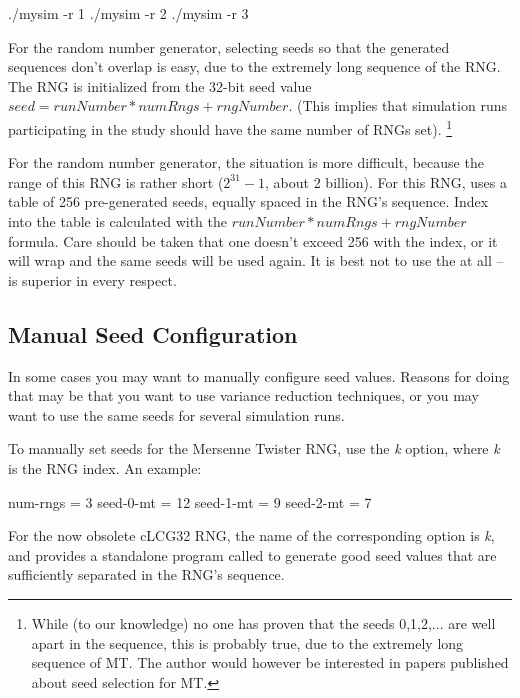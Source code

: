 \begin{commandline}
./mysim -r 1
./mysim -r 2
./mysim -r 3
\end{commandline}

For the  random number generator, selecting seeds
so that the generated sequences don't overlap is easy,
due to the extremely long sequence of the RNG.
The RNG is initialized from the 32-bit seed value $seed = runNumber*numRngs + rngNumber$.
(This implies that simulation runs participating in the study should have
the same number of RNGs set).
    \footnote{While (to our knowledge) no one has proven that the seeds 0,1,2,...
    are well apart in the sequence, this is probably true, due to the extremely
    long sequence of MT. The author would however be interested in papers
    published about seed selection for MT.}

For the  random number generator, the situation is more difficult,
because the range of this RNG is rather short ($2^{31}-1$, about 2 billion).
For this RNG, {\opp} uses a table of 256 pre-generated seeds, equally spaced
in the RNG's sequence. Index into the table is calculated with the
$runNumber*numRngs + rngNumber$ formula. Care should be taken that
one doesn't exceed 256 with the index, or it will wrap and the
same seeds will be used again. It is best not to use the 
at all --  is superior in every respect.


\subsection{Manual Seed Configuration}

In some cases you may want to manually configure seed values.
Reasons for doing that may be that you want to use variance reduction
techniques, or you may want to use the same seeds for several simulation
runs.

To manually set seeds for the Mersenne Twister RNG, use the \textit{k}
option, where \textit{k} is the RNG index. An example:

\begin{inifile}
[General]
num-rngs = 3
seed-0-mt = 12
seed-1-mt = 9
seed-2-mt = 7
\end{inifile}

\label{sec:ch-config-sim:seedtool}

For the now obsolete cLCG32 RNG, the name of the corresponding option is
\textit{k}, and {\opp} provides a standalone program
called  to generate good seed values that
are sufficiently separated in the RNG's sequence.


